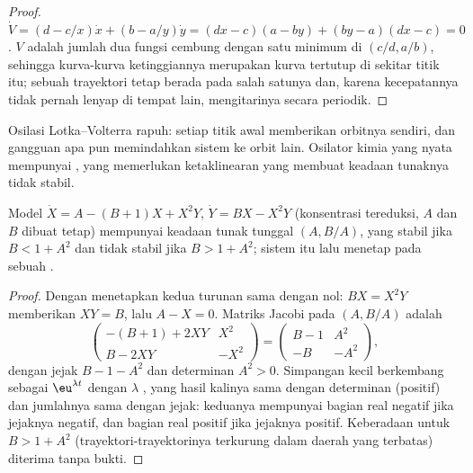 \begin{proof}
$\dot V = (d - c/x)\dot x + (b - a/y)\dot y = (dx - c)(a - by) + (by - a)(dx - c) = 0$.
$V$ adalah jumlah dua fungsi cembung dengan satu minimum di $(c/d, a/b)$,
sehingga kurva-kurva ketinggiannya merupakan kurva tertutup di sekitar titik
itu; sebuah trayektori tetap berada pada salah satunya dan, karena
kecepatannya tidak pernah lenyap di tempat lain, mengitarinya secara periodik.
\end{proof}

Osilasi Lotka--Volterra rapuh: setiap titik awal memberikan orbitnya sendiri,
dan gangguan apa pun memindahkan sistem ke orbit lain. Osilator kimia yang
nyata mempunyai , yang memerlukan ketaklinearan yang membuat
keadaan tunaknya tidak stabil.

\begin{proposition}\label{prop:b3:complex-kinetics:hopf}
Model $\dot X = A - (B + 1)X + X^2Y$, $\dot Y = BX - X^2Y$ (konsentrasi tereduksi,
$A$ dan $B$ dibuat tetap) mempunyai keadaan tunak tunggal $(A, B/A)$, yang
stabil jika $B < 1 + A^2$ dan tidak stabil jika $B > 1 + A^2$; sistem itu lalu
menetap pada sebuah .
\end{proposition}

\begin{proof}
Dengan menetapkan kedua turunan sama dengan nol: $BX = X^2Y$ memberikan $XY = B$,
lalu $A - X = 0$. Matriks Jacobi pada $(A, B/A)$ adalah
\[
  \begin{pmatrix} -(B + 1) + 2XY & X^2 \\ B - 2XY & -X^2 \end{pmatrix}
  = \begin{pmatrix} B - 1 & A^2 \\ -B & -A^2 \end{pmatrix},
\]
dengan jejak $B - 1 - A^2$ dan determinan $A^2 > 0$. Simpangan kecil berkembang
sebagai $\eu^{\lambda t}$ dengan $\lambda$ , yang hasil kalinya
sama dengan determinan (positif) dan jumlahnya sama dengan jejak: keduanya
mempunyai bagian real negatif jika jejaknya negatif, dan bagian real positif
jika jejaknya positif. Keberadaan  untuk $B > 1 + A^2$
(trayektori-trayektorinya terkurung dalam daerah yang terbatas) diterima
tanpa bukti.
\end{proof}

